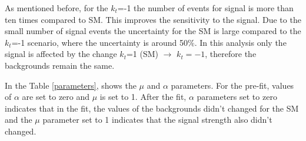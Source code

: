 	As mentioned before, for the $k_t$=-1 the number of events for signal is more than ten times compared to SM. This improves the sensitivity to the signal. Due to the small number of signal events the uncertainty for the SM is large compared to the $k_t$=-1 scenario, where the uncertainty is around 50$\%$. In this analysis only the signal is affected by the change $k_t$=1 (SM) $\rightarrow$ $k_t=-1$, therefore the backgrounds remain the same.
	
	In the Table \ref{parameters}, shows the $\mu$ and $\alpha$ parameters. For the pre-fit, values of $\alpha$ are set to zero and $\mu$ is set to 1. After the fit, $\alpha$ parameters set to zero indicates that in the fit, the values of the backgrounds didn't changed for the SM and the $\mu$ parameter set to 1 indicates that the signal strength also didn't changed.
	\pagebreak
	
